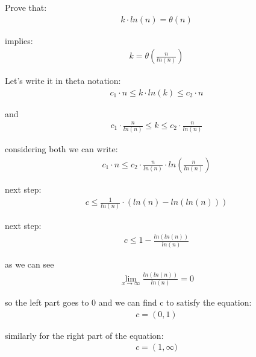 \documentclass{article}
\begin{document}
    Prove that:
    \begin{align}
        k\cdot ln(n)=\theta(n)
    \end{align}

    implies:
    \begin{align}
        k = \theta(\frac{n}{ln(n)})
    \end{align}

    Let's write it in theta notation:
    \begin{align}
        c_1 \cdot n \leq k \cdot ln(k) \leq c_2 \cdot n
    \end{align}

    and
    \begin{align}
        c_1 \cdot \frac{n}{ln(n)} \leq k \leq c_2 \cdot \frac{n}{ln(n)}
    \end{align}

    considering both we can write:
    \begin{align}
          c_1 \cdot n \leq c_{2} \cdot \frac{n}{ln(n)} \cdot ln(\frac{n}{ln(n)})
    \end{align}

    next step:
    \begin{align}
          c \leq \frac{1}{ln(n)} \cdot (ln(n)-ln(ln(n)))
    \end{align}

    next step:
    \begin{align}
          c \leq 1 - \frac{ln(ln(n))}{ln(n)}
    \end{align}

    as we can see
    \begin{align}
          \lim_{x\to\infty} \frac{ln(ln(n))}{ln(n)} = 0
    \end{align}

    so the left part goes to 0 and we can find c to satisfy the equation:
    \begin{align}
          c = \left( 0,1 \right)
    \end{align}

    similarly for the right part of the equation:
     \begin{align}
          c = \left( 1, \infty)
    \end{align}
\end{document}
